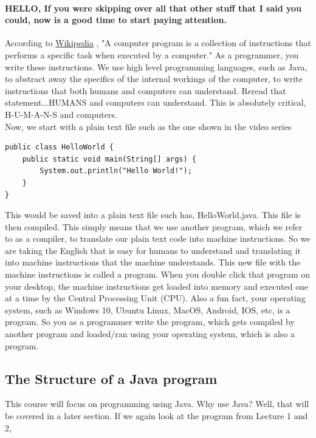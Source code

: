 \documentclass[11]{article}
\begin{document}
\paragraph{HELLO, If you were skipping over all that other stuff that I said you could, now is a good time to start paying attention.} 
According to \href{https://en.wikipedia.org/wiki/Computer_program}{Wikipedia} , "A computer program is a collection of instructions that performs a specific task when executed by a computer." As a programmer, you write these instructions. We use high level programming languages, such as Java, to abstract away the specifics of the internal workings of the computer, to write instructions that both humans and computers can understand. Reread that statement...HUMANS and computers can understand. This is absolutely critical, H-U-M-A-N-S and computers.\\

Now, we start with a plain text file such as the one shown in the video series
\begin{lstlisting}
public class HelloWorld {
    public static void main(String[] args) {
        System.out.println("Hello World!");
    }
}
\end{lstlisting}

This would be saved into a plain text file such has, HelloWorld.java. This file is then compiled. This simply means that we use another program, which we refer to as a compiler, to translate our plain text code into machine instructions. So we are taking the English that is easy for humans to understand and translating it into machine instructions that the machine understands. This new file with the machine instructions is called a program. When you double click that program on your desktop, the machine instructions get loaded into memory and executed one at a time by the Central Processing Unit (CPU). Also a fun fact, your operating system, such as Windows 10, Ubuntu Linux, MacOS, Android, IOS, etc, is a program. So you as a programmer write the program, which gets compiled by another program and loaded/ran using your operating system, which is also a program.\\

\subsection{The Structure of a Java program}
This course will focus on programming using Java. Why use Java? Well, that will be covered in a later section. If we again look at the program from Lecture 1 and 2, 
\end{document}

